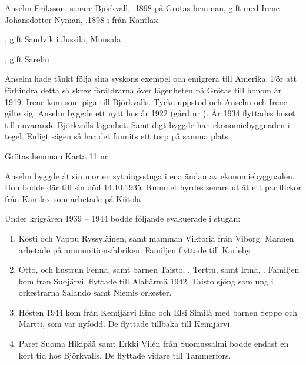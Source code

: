 Anselm Eriksson, senare Björkvall, .1898 på Grötas hemman, gift med Irene Johansdotter Nyman, .1898 i från Kantlax.
\begin{jhchildren}
  \item {}
  \item {}, gift Sandvik i Jussila, Munsala
  \item {}, gift Sarelin
  \item {}
\end{jhchildren}
Anselm hade tänkt följa sina syskons exempel och emigrera till Amerika. För att förhindra detta så skrev föräldrarna över lägenheten på Grötas till honom år 1919. Irene kom som piga till Björkvalls. Tycke uppstod och Anselm och Irene gifte sig. Anselm byggde ett nytt hus år 1922 (gård nr ). År 1934 flyttades huset till nuvarande Björkvalls lägenhet. Samtidigt byggde han ekonomiebyggnaden i tegel. Enligt sägen så har det funnits ett torp på samma plats.



		Grötas hemman  Karta 11	   nr 

Anselm byggde åt sin mor en sytningsstuga i ena ändan av ekonomiebyggnaden. Hon bodde där till sin död 14.10.1935.
Rummet hyrdes senare ut  åt ett par flickor från Kantlax som 	arbetade på Kiitola.

Under krigsåren 1939 – 1944 bodde följande evakuerade i stugan:
\begin{enumerate}
  \item Kosti och Vappu Ryssyläinen, samt mamman Viktoria från Viborg. Mannen arbetade på ammunitionsfabriken. Familjen
	flyttade till Karleby.
  \item Otto,  och hustrun Fenna,  samt barnen Taisto, , Terttu,  samt Irma, . Familjen kom från Suojärvi, flyttade till Alahärmä 1942. Taisto sjöng som ung i 	orkestrarna Salando samt Niemis orkester.
  \item Hösten 1944 kom från Kemijärvi Eino och Elsi Similä med barnen Seppo och Martti, som var nyfödd. De flyttade tillbaka till Kemijärvi.
  \item Paret Suoma Hikipää samt Erkki Vilén från Suomussalmi bodde endast en kort tid hos Björkvalls. De flyttade vidare till Tammerfors.
\end{enumerate}


